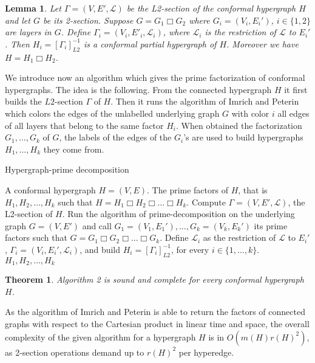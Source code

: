 \documentclass[copyright]{eptcs}
\newtheorem{Lem}{Lemma}
\newtheorem{Theo}{Theorem}
\newcommand{\mc}[1]{\mathcal{#1}}
\newcommand{\chg}[1]{{#1}}
\begin{document}
\begin{Lem}\label{LmPassageAuProduitEtiquetage} Let $\Gamma = (V,E',\mc L)$ be the L2-section of the conformal hypergraph $H$ and let $G$ be its 2-section. Suppose $G = G_1 \Box G_2$ where \chg{$G_i=(V_i,E_i')$, $i \in \{1,2\}$} are \chg{layers in} $G$. Define  $\Gamma _ i = (V_i, E'_i , \mc L_i)$, where $\mc L_i$ is the restriction of $\mc L$ to $E_i'$. Then $H_i=[\Gamma _i ]^{-1}_{L2}$ is a conformal partial hypergraph of $H$. Moreover we have $H = H_1 \Box H_2$.
\end{Lem}


We introduce now an algorithm which gives the prime factorization of conformal hypergraphs. The idea is the following. From the connected hypergraph $H$ it first builds the $L2$-section $\Gamma$ of $H$. Then it runs the algorithm of Imrich and Peterin which colors the edges of the unlabelled underlying graph $G$ with color $i$ all edges of all layers that belong to the same factor $H_i$. When obtained the factorization $G_1, \dotsc ,G_k$ of $G$, the labels of the edges of the $G_i$'s are used to build hypergraphs $H_1, \dotsc , H_k$ they come from.

    \begin{algorithm}[!h]
        \caption{Hypergraph-prime decomposition}
        \label{algo2}
        \begin{algorithmic}[1]
        \REQUIRE A conformal hypergraph $H=(V,E)$.
        \ENSURE The prime factors of $H$, that is $H_1,H_2, \ldots, H_k$ such that
        $H = H_1 \Box H_2 \Box \ldots \Box H_k$.
    \STATE Compute $\Gamma =(V,E',\mc L)$, the L2-section of $H$.
    \STATE Run the algorithm of prime-decomposition on the underlying graph $G=(V,E')$ and call $G_1 =(V_1,E_1'), \ldots, G_k=(V_k, E_k')$ its prime factors such that $G = G_1 \Box G_2 \Box \ldots \Box G_k$.
    \STATE Define $\mc L_i$ as the restriction of $\mc L$ to $E_i'$, $\Gamma_i = (V_i,E_i',\mc L_i)$, and build $H_i = [\Gamma_i]^{-1}_{L2}$, for every $i \in \{1, \dotsc, k\}$.
\RETURN $H_1,H_2, \ldots, H_k$
\end{algorithmic}
    \end{algorithm}


\begin{Theo} Algorithm 2 is sound and complete for every conformal hypergraph $H$.
\end{Theo}


As the algorithm of Imrich and Peterin is able to return the factors of connected graphs with respect to the Cartesian product in linear time and space, the overall complexity of the given algorithm for a hypergraph $H$ is in $O(m(H)r(H)^2)$, as 2-section operations demand up to $r(H)^2$ per hyperedge.
\end{document}
